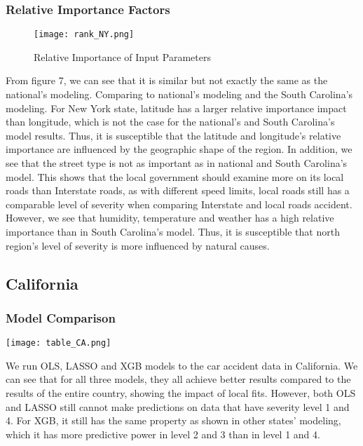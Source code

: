 \documentclass[twocolumn]{article}
\begin{document}
\subsubsection{Relative Importance Factors}
\begin{figure}[h]
    \centering
    \texttt{[image: rank\_NY.png]}
    \caption{Relative Importance of Input Parameters}
\end{figure}
From figure 7, we can see that it is similar but not exactly the same as the national's modeling. Comparing to national's modeling and the South Carolina's modeling. For New York state, latitude has a larger relative importance impact than longitude, which is not the case for the national's and South Carolina's model results. Thus, it is susceptible that the latitude and longitude's relative importance are influenced by the geographic shape of the region. In addition, we see that the street type is not as important as in national and South Carolina's model. This shows that the local government should examine more on its local roads than Interstate roads, as with different speed limits, local roads still has a comparable level of severity when comparing Interstate and local roads accident. However, we see that humidity, temperature and weather has a high relative importance than in South Carolina's model. Thus, it is susceptible that north region's level of severity is more influenced by natural causes. 

\subsection{California}
\subsubsection{Model Comparison}
\begin{table}[h]
    \centering
    \texttt{[image: table\_CA.png]}
    \caption{}
\end{table}
We run OLS, LASSO and XGB models to the car accident data in California. We can see that for all three models, they all achieve better results compared to the results of the entire country, showing the impact of local fits. However, both OLS and LASSO still cannot make predictions on data that have severity level 1 and 4. For XGB, it still has the same property as shown in other states' modeling, which it has more predictive power in level 2 and 3 than in level 1 and 4.
\end{document}
